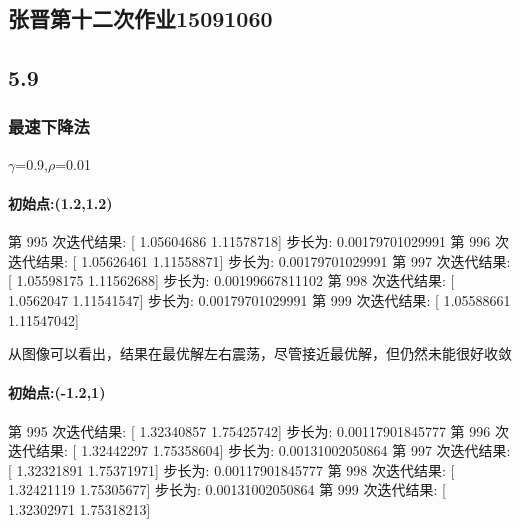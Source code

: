 \documentclass[]{article}
\date{}
\let\oldparagraph\paragraph
\renewcommand{\paragraph}[1]{\oldparagraph{#1}\mbox{}}
\begin{document}
\subsection{张晋第十二次作业15091060}\label{header-n0}

\subsection{5.9}\label{header-n3}

\subsubsection{最速下降法}\label{header-n4}

\(\gamma\)=0.9,\(\rho\)=0.01

\paragraph{初始点:(1.2,1.2)}\label{header-n7}


第 995 次迭代结果: {[} 1.05604686 1.11578718{]} 步长为: 0.00179701029991
第 996 次迭代结果: {[} 1.05626461 1.11558871{]} 步长为: 0.00179701029991
第 997 次迭代结果: {[} 1.05598175 1.11562688{]} 步长为: 0.00199667811102
第 998 次迭代结果: {[} 1.0562047 1.11541547{]} 步长为: 0.00179701029991
第 999 次迭代结果: {[} 1.05588661 1.11547042{]}

从图像可以看出，结果在最优解左右震荡，尽管接近最优解，但仍然未能很好收敛

\paragraph{初始点:(-1.2,1)}\label{header-n35}


第 995 次迭代结果: {[} 1.32340857 1.75425742{]} 步长为: 0.00117901845777
第 996 次迭代结果: {[} 1.32442297 1.75358604{]} 步长为: 0.00131002050864
第 997 次迭代结果: {[} 1.32321891 1.75371971{]} 步长为: 0.00117901845777
第 998 次迭代结果: {[} 1.32421119 1.75305677{]} 步长为: 0.00131002050864
第 999 次迭代结果: {[} 1.32302971 1.75318213{]}
\end{document}
